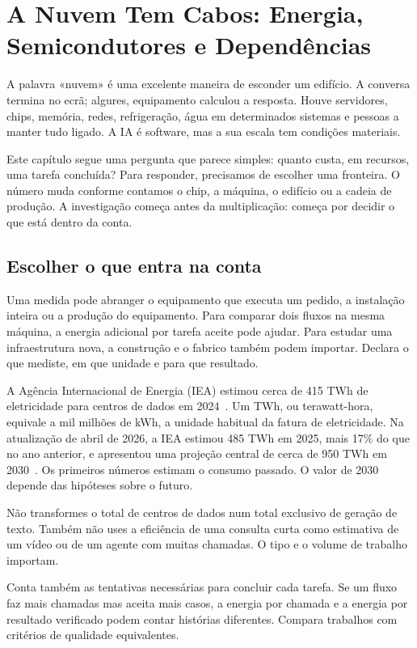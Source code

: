 \chapter{A Nuvem Tem Cabos: Energia, Semicondutores e Dependências}
\label{ch:energia}

A palavra «nuvem» é uma excelente maneira de esconder um edifício. A conversa termina no ecrã; algures, equipamento calculou a resposta. Houve servidores, chips, memória, redes, refrigeração, água em determinados sistemas e pessoas a manter tudo ligado. A IA é software, mas a sua escala tem condições materiais.

Este capítulo segue uma pergunta que parece simples: quanto custa, em recursos, uma tarefa concluída? Para responder, precisamos de escolher uma fronteira. O número muda conforme contamos o chip, a máquina, o edifício ou a cadeia de produção. A investigação começa antes da multiplicação: começa por decidir o que está dentro da conta.

\section{Escolher o que entra na conta}
Uma medida pode abranger o equipamento que executa um pedido, a instalação inteira ou a produção do equipamento. Para comparar dois fluxos na mesma máquina, a energia adicional por tarefa aceite pode ajudar. Para estudar uma infraestrutura nova, a construção e o fabrico também podem importar. Declara o que mediste, em que unidade e para que resultado.

A Agência Internacional de Energia (IEA) estimou cerca de 415 TWh de eletricidade para centros de dados em 2024~\citep{iea2025}. Um TWh, ou terawatt-hora, equivale a mil milhões de kWh, a unidade habitual da fatura de eletricidade. Na atualização de abril de 2026, a IEA estimou 485 TWh em 2025, mais 17\% do que no ano anterior, e apresentou uma projeção central de cerca de 950 TWh em 2030~\citep{iea2026}. Os primeiros números estimam o consumo passado. O valor de 2030 depende das hipóteses sobre o futuro.

Não transformes o total de centros de dados num total exclusivo de geração de texto. Também não uses a eficiência de uma consulta curta como estimativa de um vídeo ou de um agente com muitas chamadas. O tipo e o volume de trabalho importam.

Conta também as tentativas necessárias para concluir cada tarefa. Se um fluxo faz mais chamadas mas aceita mais casos, a energia por chamada e a energia por resultado verificado podem contar histórias diferentes. Compara trabalhos com critérios de qualidade equivalentes.

